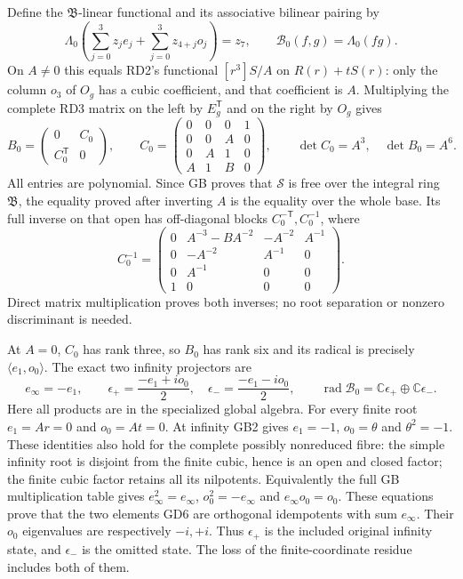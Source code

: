 \documentclass[11pt]{article}
\newcommand{\C}{\mathbb C}
\begin{document}
Define the $\mathfrak B$-linear functional and its associative
bilinear pairing by
\begin{equation}
 \Lambda_0\left(\sum_{j=0}^3z_je_j+\sum_{j=0}^3z_{4+j}o_j\right)=z_7,
 \qquad\mathcal B_0(f,g)=\Lambda_0(fg).
 \tag{GD3}
\end{equation}
On $A\ne0$ this equals RD2's functional
$[r^3]S/A$ on $R(r)+tS(r)$: only the column $o_3$ of
$O_g$ has a cubic coefficient, and that coefficient is $A$.
Multiplying the complete RD3 matrix on the left by $E_g^{\mathsf T}$
and on the right by $O_g$ gives
\begin{equation}
 B_0=\begin{pmatrix}0&C_0\\C_0^{\mathsf T}&0\end{pmatrix},\qquad
 C_0=\begin{pmatrix}0&0&0&1\\0&0&A&0\\0&A&1&0\\A&1&B&0\end{pmatrix},
 \qquad\det C_0=A^3,\quad\det B_0=A^6.
 \tag{GD4}
\end{equation}
All entries are polynomial. Since GB proves that $\mathscr S$
is free over the integral ring $\mathfrak B$, the equality
proved after inverting $A$ is the equality over the whole base.
Its full inverse on that open has off-diagonal blocks
$C_0^{-\mathsf T},C_0^{-1}$, where
\begin{equation}
 C_0^{-1}=\begin{pmatrix}
 0&A^{-3}-BA^{-2}&-A^{-2}&A^{-1}\\
 0&-A^{-2}&A^{-1}&0\\0&A^{-1}&0&0\\1&0&0&0
 \end{pmatrix}.
 \tag{GD5}
\end{equation}
Direct matrix multiplication proves both inverses; no root
separation or nonzero discriminant is needed.

At $A=0$, $C_0$ has rank three, so $B_0$ has rank six and
its radical is precisely $\langle e_1,o_0\rangle$. The exact
two infinity projectors are
\begin{equation}
 e_\infty=-e_1,\qquad
 \epsilon_+=\frac{-e_1+i o_0}{2},\quad
 \epsilon_- =\frac{-e_1-i o_0}{2},\qquad
 \operatorname{rad}\mathcal B_0=\C\epsilon_+\oplus\C\epsilon_-.
 \tag{GD6}
\end{equation}
Here all products are in the specialized global algebra.
For every finite root $e_1=Ar=0$ and $o_0=At=0$.
At infinity GB2 gives $e_1=-1$, $o_0=\theta$ and
$\theta^2=-1$. These identities also hold for the complete
possibly nonreduced fibre: the simple infinity root is
disjoint from the finite cubic, hence is an open and closed
factor; the finite cubic factor retains all its nilpotents.
Equivalently the full GB multiplication table gives
$e_\infty^2=e_\infty$, $o_0^2=-e_\infty$ and
$e_\infty o_0=o_0$. These equations prove that the two
elements GD6 are orthogonal idempotents with sum $e_\infty$.
Their $o_0$ eigenvalues are respectively $-i,+i$.
Thus $\epsilon_+$ is the included original infinity state,
and $\epsilon_-$ is the omitted state. The loss of the
finite-coordinate residue includes both of them.
\end{document}
